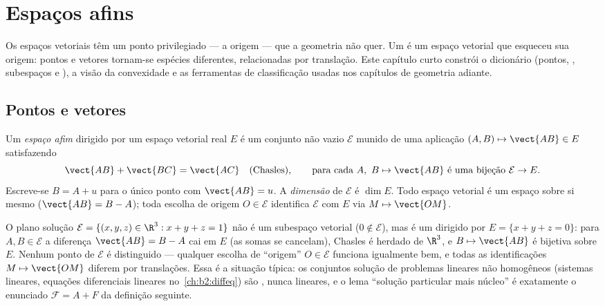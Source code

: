 \chapter{Espaços afins}\label{ch:b2:affine}

Os espaços vetoriais têm um ponto privilegiado --- a origem --- que
a geometria não quer. Um \emph{} é um espaço vetorial
que esqueceu sua origem: pontos e vetores tornam-se espécies
diferentes, relacionadas por translação. Este capítulo curto constrói o
dicionário (pontos, , subespaços e ), a
visão  da convexidade e as ferramentas de classificação usadas nos
capítulos de geometria adiante.

\section{Pontos e vetores}

\begin{definition}\label{def:b2:affine:def}
Um \emph{espaço afim} dirigido por um espaço
vetorial real $E$ é um conjunto não vazio $\mathcal{E}$ munido de uma aplicação
$(A, B) \mapsto \vect{AB} \in E$ satisfazendo
\[
\vect{AB} + \vect{BC} = \vect{AC}
\quad \text{(Chasles)},
\qquad
\text{para cada } A,\ B \mapsto \vect{AB} \text{ é uma bijeção }
\mathcal{E} \to E .
\]
Escreve-se $B = A + u$ para o único ponto com $\vect{AB} = u$.
A \emph{dimensão} de $\mathcal{E}$ é $\dim E$. Todo espaço
vetorial é um espaço  sobre si mesmo ($\vect{AB} = B - A$); toda
escolha de origem $O \in \mathcal{E}$ identifica $\mathcal{E}$ com
$E$ via $M \mapsto \vect{OM}$.
\end{definition}

\begin{example}\label{ex:b2:affine:planeexample}
O plano solução $\mathcal E = \{(x, y, z) \in \R^3 : x + y
+ z = 1\}$ não é um subespaço vetorial ($0 \notin \mathcal E$),
mas é um  dirigido por $E = \{x + y + z =
0\}$: para $A, B \in \mathcal E$ a diferença $\vect{AB} = B
- A$ cai em $E$ (as somas se cancelam), Chasles é herdado
de $\R^3$, e $B \mapsto \vect{AB}$ é bijetiva sobre $E$.
Nenhum ponto de $\mathcal E$ é distinguido --- qualquer escolha de
``origem'' $O \in \mathcal E$ funciona igualmente bem, e todas as
identificações $M \mapsto \vect{OM}$ diferem por translações.
Essa é a situação típica: os conjuntos solução de problemas
lineares não homogêneos (sistemas lineares, equações diferenciais
lineares no~\cref{ch:b2:diffeq}) são , nunca lineares,
e o lema ``solução particular mais núcleo'' é exatamente
o enunciado $\mathcal F = A + F$ da definição seguinte.
\end{example}

